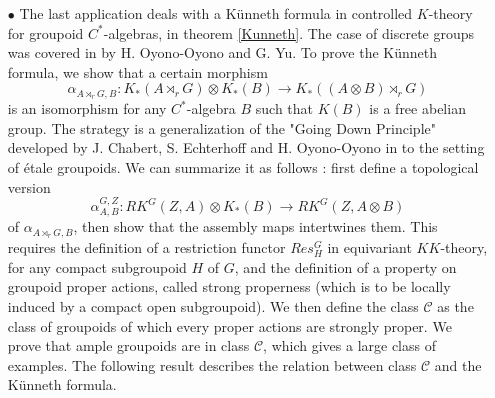 \begin{itemize}
\item[$\bullet$] The last application deals with a Künneth formula in controlled $K$-theory for groupoid $C^*$-algebras, in theorem \ref{Kunneth}. The case of discrete groups was covered in \cite{OY4} by H. Oyono-Oyono and G. Yu. To prove the Künneth formula, we show that a certain morphism 
\[\alpha_{A\rtimes_r G,B} : K_*(A\rtimes_r G) \otimes K_*(B) \rightarrow K_*((A\otimes B) \rtimes_r G)\] 
is an isomorphism for any $C^*$-algebra $B$ such that $K(B)$ is a free abelian group. The strategy is a generalization of the "Going Down Principle" developed by J. Chabert, S. Echterhoff and H. Oyono-Oyono in \cite{ChabertEOY} to the setting of étale groupoids. We can summarize it as follows : first define a topological version \[\alpha_{A,B}^{G,Z} : RK^G(Z,A)\otimes K_*(B)\rightarrow RK^G(Z,A\otimes B )\] of $\alpha_{A\rtimes_r G,B}$, then show that the assembly maps intertwines them. This requires the definition of a restriction functor $Res_H^G$ in equivariant $KK$-theory, for any compact subgroupoid $H$ of $G$, and the definition of a property on groupoid proper actions, called strong properness (which is to be locally induced by a compact open subgroupoid). We then define the class $\mathcal C$ as the class of groupoids of which every proper actions are strongly proper. We prove that ample groupoids are in class $\mathcal C$, which gives a large class of examples. The following result describes the relation between class $\mathcal C$ and the Künneth formula. \\



\end{itemize}
